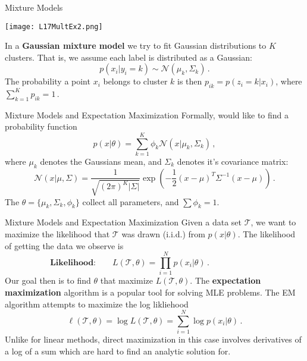 \documentclass[10pt, table, dvipsnames,xcdraw,handout]{beamer}
\newcommand{\cT}{\ensuremath{\mathcal{T}}}
\begin{document}
\begin{frame}[fragile]{Mixture Models}
  \begin{minipage}[t][0.5\textheight][t]{\textwidth}
	\centering \texttt{[image: L17MultEx2.png]}
  \end{minipage}
  \vfill
\begin{minipage}[t][0.5\textheight][t]{\textwidth}
In a \textbf{Gaussian mixture model} we try to fit Gaussian distributions to $K$ clusters. That is, we assume each label is distributed as a Gaussian:
$$
p(x_i | y_i = k) \sim \mathcal{N}(\mu_k,\Sigma_k) \,.
$$\pause 
The probability a point $x_i$ belongs to cluster $k$ is then $p_{ik} = p(z_i = k | x_i)$, where
$
\sum_{k=1}^K p_{ik} = 1\,.
$
\end{minipage}
\end{frame}



\begin{frame}[fragile]{Mixture Models and Expectation Maximization}
Formally, would like to find a probability function
$$
p(x | \theta) = \sum_{k=1}^K \phi_k \mathcal{N}(x | \mu_k,\Sigma_k)\,,
$$\pause
where $\mu_k$ denotes the Gaussians mean, and $\Sigma_k$ denotes it's covariance matrix: 
$$
\mathcal{N}(x | \mu,\Sigma) = \frac{1}{\sqrt{(2\pi)^K|\Sigma|}}\exp\left(-\frac12(x-\mu)^T\Sigma^{-1}(x-\mu)\right)\,.
$$  \pause
The $\theta = \{\mu_k,\Sigma_k,\phi_k\}$ collect all parameters, and $\sum \phi_k = 1$. 
\end{frame}



\begin{frame}[fragile]{Mixture Models and Expectation Maximization}
Given a data set $\cT$, we want to maximize the likelihood that $\cT$ was drawn (i.i.d.) from $p(x | \theta)$. \pause The likelihood of getting the data we observe is
$$
\textbf{Likelihood:}\hspace{2em}L(\cT, \theta) = \prod_{i=1}^N p(x_i|\theta)\,.\hspace{6em}
$$\pause
Our goal then is to find $\theta$ that maximize $L(\cT, \theta)$. The \textbf{expectation maximization} algorithm is a popular tool for solving MLE problems. The EM algorithm attempts to maximize the log likliehood
$$
\ell(\cT, \theta) = \log L(\cT, \theta)  =  \sum_{i=1}^N \log p(x_i|\theta)\,.
$$\pause
Unlike for linear methods, direct maximization in this case involves derivatives of a log of a sum which are hard to find an analytic solution for.
\end{frame}
\end{document}
